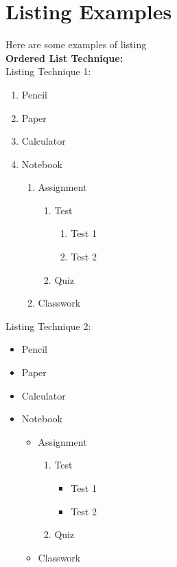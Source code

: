 \chapter{Listing Examples}
Here are some examples of listing\\
\textbf{Ordered List Technique:}\\
Listing Technique 1:
\vspace{-18pt} %
\begin{enumerate}
\item Pencil
\item Paper
\item Calculator
\item Notebook
	\begin{enumerate}
	\item Assignment
		\begin{enumerate}
		\item Test
			\begin{enumerate}
			\item Test 1
			\item Test 2
			\end{enumerate}
		\item Quiz
		\end{enumerate}
	\item Classwork
	\end{enumerate}
\end{enumerate}

Listing Technique 2:
\vspace{-18pt}
\begin{itemize}
\item Pencil
\item Paper
\item Calculator
\item Notebook
	\begin{itemize}
		\item Assignment
		\begin{enumerate}
		\item Test
			\begin{itemize}
			\item Test 1
			\item Test 2
			\end{itemize}
		\item Quiz
		\end{enumerate}
	\item Classwork
	\end{itemize}
\end{itemize}

